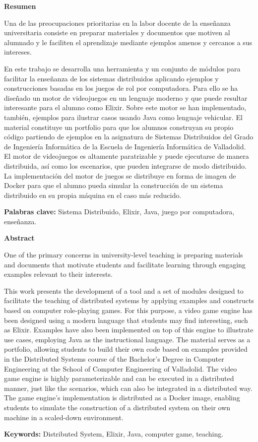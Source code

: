 \vskip 2cm

{\noindent\bfseries\Huge Resumen}

\vskip 1cm

Una de las preocupaciones prioritarias en la labor docente de la enseñanza universitaria consiste en preparar materiales y documentos que motiven al alumnado y le faciliten el aprendizaje mediante ejemplos amenos y cercanos a sus intereses.

En este trabajo se desarrolla una herramienta y un conjunto de módulos para facilitar la enseñanza de los sistemas distribuidos aplicando ejemplos y construcciones basadas en los juegos de rol por computadora. Para ello se ha diseñado un motor de videojuegos en un lenguaje moderno y que puede resultar interesante para el alumno como Elixir. Sobre este motor se han implementado, también, ejemplos para ilustrar casos usando Java como lenguaje vehicular. El material constituye un portfolio para que los alumnos construyan su propio código partiendo de ejemplos en la asignatura de  Sistemas Distribuidos del Grado de Ingeniería Informática de la Escuela de Ingeniería Informática de Valladolid. El motor de videojuegos es altamente paratrizable y puede ejecutarse de manera distribuida, así como los escenarios, que pueden integrarse de modo distribuido. La implementación del motor de juegos se distribuye en forma de imagen de Docker para que el alumno pueda simular la construcción de un sistema distribuido en su propia máquina en el caso más reducido.

\textbf{Palabras clave:} Sistema Distribuido, Elixir, Java, juego por computadora, enseñanza.

\newpage

{\bfseries\Huge Abstract}

\vskip 1cm

One of the primary concerns in university-level teaching is preparing materials and documents that motivate students and facilitate learning through engaging examples relevant to their interests.

This work presents the development of a tool and a set of modules designed to facilitate the teaching of distributed systems by applying examples and constructs based on computer role-playing games. For this purpose, a video game engine has been designed using a modern language that students may find interesting, such as Elixir. Examples have also been implemented on top of this engine to illustrate use cases, employing Java as the instructional language. The material serves as a portfolio, allowing students to build their own code based on examples provided in the Distributed Systems course of the Bachelor's Degree in Computer Engineering at the School of Computer Engineering of Valladolid. The video game engine is highly parameterizable and can be executed in a distributed manner, just like the scenarios, which can also be integrated in a distributed way. The game engine's implementation is distributed as a Docker image, enabling students to simulate the construction of a distributed system on their own machine in a scaled-down environment.

\textbf{Keywords:} Distributed System, Elixir, Java, computer game, teaching.